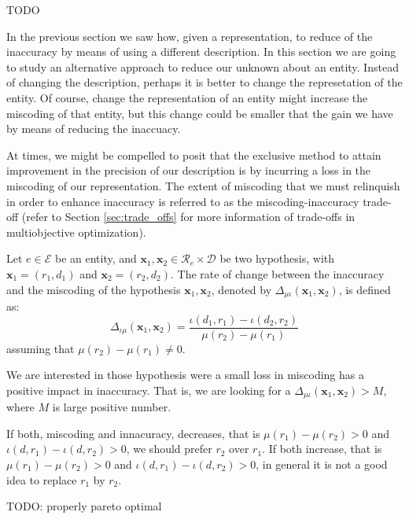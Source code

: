 {\color{red} TODO

In the previous section we saw how, given a representation, to reduce of the inaccuracy by means of using a different description. In this section we are going to study an alternative approach to reduce our unknown about an entity. Instead of changing the description, perhaps it is better to change the represetation of the entity. Of course, change the representation of an entity might increase the miscoding of that entity, but this change could be smaller that the gain we have by means of reducing the inaccuacy. }

At times, we might be compelled to posit that the exclusive method to attain improvement in the precision of our description is by incurring a loss in the miscoding of our representation. The extent of miscoding that we must relinquish in order to enhance inaccuracy is referred to as the miscoding-inaccuracy trade-off (refer to Section \ref{sec:trade_offs} for more information of trade-offs in multiobjective optimization).

\begin{definition}
Let $e \in \mathcal{E}$ be an entity, and $\mathbf{x}_1, \mathbf{x}_2 \in \mathcal{R}_e \times \mathcal{D}$ be two hypothesis, with $\mathbf{x}_1 = (r_1, d_1)$ and $\mathbf{x}_2 = (r_2, d_2)$. The rate of change between the inaccuracy and the miscoding of the hypothesis $\mathbf{x}_1, \mathbf{x}_2$, denoted by $\Delta_{\mu \iota} ( \mathbf{x}_1, \mathbf{x}_2 )$, is defined as:
\[
\Delta_{\iota \mu} ( \mathbf{x}_1, \mathbf{x}_2 ) = \frac{\iota(d_1, r_1) - \iota(d_2, r_2)}{\mu(r_2) - \mu(r_1)}
\] 
assuming that $\mu(r_2) - \mu(r_1) \neq 0$.
\end{definition}

We are interested in those hypothesis were a small loss in miscoding has a positive impact in inaccuracy. That is, we are looking for a $\Delta_{\mu \iota} ( \mathbf{x}_1, \mathbf{x}_2 ) > M$, where $M$ is large positive number.

{\color{red} If both, miscoding and innacuracy, decreases, that is $\mu(r_1) - \mu(r_2) > 0$ and $\iota(d, r_1) - \iota(d, r_2) > 0$, we should prefer $r_2$ over $r_1$. If both increase, that is $\mu(r_1) - \mu(r_2) > 0$ and $\iota(d, r_1) - \iota(d, r_2) > 0$, in general it is not a good idea to replace $r_1$ by $r_2$. }



{\color{red} TODO: properly pareto optimal}

%
%

